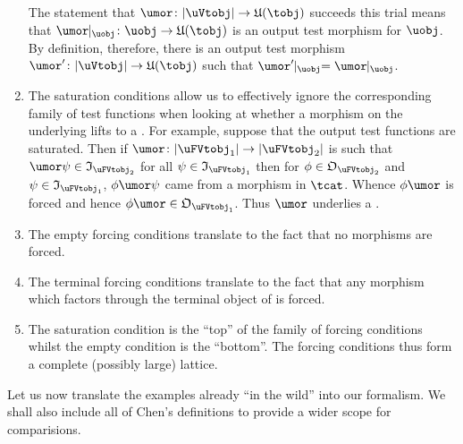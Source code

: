 \documentclass[%
a4paper,%
arxiv,%
defaults
]{myclass}
\begin{document}
\begin{remark}
\begin{enumerate}
\begin{centre}
\end{centre}

The statement that \(\umor \colon \forfunc[\uVtobj] \to \ufunc(\tobj)\) succeeds this trial means that \(\umor\restrict_{\uobj} \colon \uobj \to \ufunc(\tobj)\) is an output test morphism for \(\uobj\).
By definition, therefore, there is an output test morphism \(\umor' \colon \forfunc[\uVtobj] \to \ufunc(\tobj)\) such that \(\umor' \restrict_{\uobj} = \umor\restrict_{\uobj}\).

\item The saturation conditions allow us to effectively ignore the corresponding family of test functions when looking at whether a morphism on the underlying \uobjs lifts to a \uFVtmoralt.
For example, suppose that the output test functions are saturated.
Then if \(\umor \colon \forfunc[\uFVtobj_1] \to \forfunc[\uFVtobj_2]\) is such that \(\umor \ifn \in \itest_{\uFVtobj_2}\) for all \(\ifn \in \itest_{\uFVtobj_1}\) then for \(\ofn \in \otest_{\uFVtobj_2}\) and \(\ifn \in \itest_{\uFVtobj_1}\), \(\ofn \umor \ifn\) came from a morphism in \(\tcat\).
Whence \(\ofn \umor\) is forced and hence \(\ofn \umor \in \otest_{\uFVtobj_1}\).
Thus \(\umor\) underlies a \uFVtmor.

\item The empty forcing conditions translate to the fact that no morphisms are forced.

\item The terminal forcing conditions translate to the fact that any morphism which factors through the terminal object of \tcat is forced.

\item The saturation condition is the ``top'' of the family of forcing conditions whilst the empty condition is the ``bottom''.
The forcing conditions thus form a complete (possibly large) lattice.
\end{enumerate}
\end{remark}
\medskip

Let us now translate the examples already ``in the wild'' into our formalism.
We shall also include all of Chen's definitions to provide a wider scope for comparisions.
\end{document}

